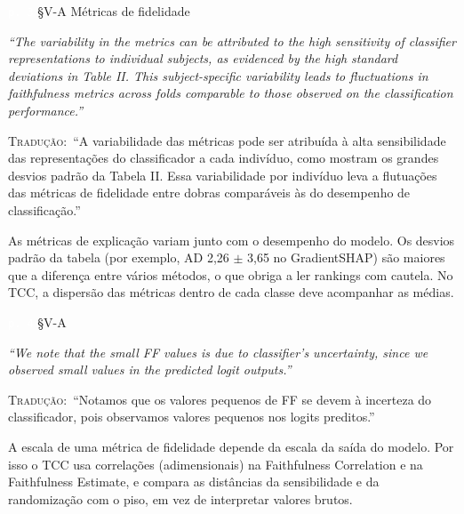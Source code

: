 \documentclass[11pt,a4paper]{article}
\newcommand{\pagechip}[1]{{\setlength{\fboxsep}{1.5pt}\colorbox{cAcc}{\textcolor{white}{\scriptsize\texttt{#1}}}}}
\newenvironment{origquote}{\par\itshape\small}{\par}
\newenvironment{tradquote}{\par\small\textsc{Tradução:}\ }{\par}
\newcommand{\explab}[1]{\par\smallskip{\small\color{cAcc}\textbf{\MakeUppercase{#1}}}\par}
\begin{document}
\begin{citacard}{\pagechip{p. 3} §V-A Métricas de fidelidade}
\begin{origquote}“The variability in the metrics can be attributed to the high sensitivity of classifier representations to individual subjects, as evidenced by the high standard deviations in Table II. This subject-specific variability leads to fluctuations in faithfulness metrics across folds comparable to those observed on the classification performance.”\end{origquote}
\begin{tradquote}“A variabilidade das métricas pode ser atribuída à alta sensibilidade das representações do classificador a cada indivíduo, como mostram os grandes desvios padrão da Tabela II. Essa variabilidade por indivíduo leva a flutuações das métricas de fidelidade entre dobras comparáveis às do desempenho de classificação.”\end{tradquote}
\explab{Explicação}
As métricas de explicação variam junto com o desempenho do modelo. Os desvios padrão da tabela (por exemplo, AD 2,26 $\pm$ 3,65 no GradientSHAP) são maiores que a diferença entre vários métodos, o que obriga a ler rankings com cautela. No TCC, a dispersão das métricas dentro de cada classe deve acompanhar as médias.
\end{citacard}

\begin{citacard}{\pagechip{p. 4} §V-A}
\begin{origquote}“We note that the small FF values is due to classifier’s uncertainty, since we observed small values in the predicted logit outputs.”\end{origquote}
\begin{tradquote}“Notamos que os valores pequenos de FF se devem à incerteza do classificador, pois observamos valores pequenos nos logits preditos.”\end{tradquote}
\explab{Explicação}
A escala de uma métrica de fidelidade depende da escala da saída do modelo. Por isso o TCC usa correlações (adimensionais) na Faithfulness Correlation e na Faithfulness Estimate, e compara as distâncias da sensibilidade e da randomização com o piso, em vez de interpretar valores brutos.
\end{citacard}
\end{document}
